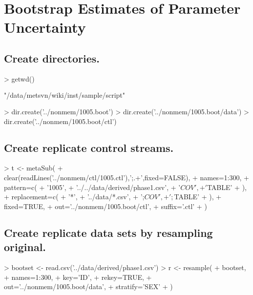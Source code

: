 \section{Bootstrap Estimates of Parameter Uncertainty}
\subsection{Create directories.}
\begin{Schunk}
\begin{Sinput}
> getwd()
\end{Sinput}
\begin{Soutput}
[1] "/data/metsvn/wiki/inst/sample/script"
\end{Soutput}
\begin{Sinput}
> dir.create('../nonmem/1005.boot')
> dir.create('../nonmem/1005.boot/data')
> dir.create('../nonmem/1005.boot/ctl')
\end{Sinput}
\end{Schunk}
\subsection{Create replicate control streams.}
\begin{Schunk}
\begin{Sinput}
> t <- metaSub(
+      clear(readLines('../nonmem/ctl/1005.ctl'),';.+',fixed=FALSE),
+      names=1:300,
+      pattern=c(
+          '1005',
+          '../../data/derived/phase1.csv',
+          '$COV',
+          '$TABLE'
+      ),
+      replacement=c(
+          '*',
+          '../data/*.csv',
+          ';$COV',
+          ';$TABLE'
+     ),
+     fixed=TRUE,
+     out='../nonmem/1005.boot/ctl',
+     suffix='.ctl'
+  )
\end{Sinput}
\end{Schunk}
\subsection{Create replicate data sets by resampling original.}
\begin{Schunk}
\begin{Sinput}
>  bootset <- read.csv('../data/derived/phase1.csv')
>  r <- resample(
+  	bootset,
+  	names=1:300,
+  	key='ID',
+  	rekey=TRUE,
+  	out='../nonmem/1005.boot/data',
+  	stratify='SEX'
+  )
\end{Sinput}
\end{Schunk}

